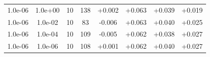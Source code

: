 \documentclass[11pt,a4paper]{article}
\begin{document}
\begin{table}
{\begin{tabular}{*{8}c}
 1.0e-06 	 & 1.0e+00 	 & 10 & 138 	 & +0.002 & +0.063 & +0.039 & +0.019 \\ 
 1.0e-06 	 & 1.0e-02 	 & 10 & 83 	 & -0.006 & +0.063 & +0.040 & +0.025 \\ 
 1.0e-06 	 & 1.0e-04 	 & 10 & 109 	 & -0.005 & +0.062 & +0.038 & +0.027 \\ 
 1.0e-06 	 & 1.0e-06 	 & 10 & 108 	 & +0.001 & +0.062 & +0.040 & +0.027 \\ 
\end{tabular}}
\label{Tab::Noise0.03}
\end{table} 
\end{document}
